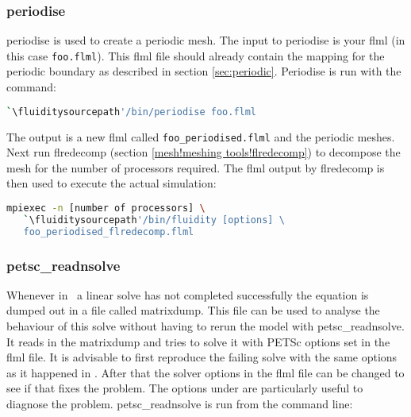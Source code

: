 
\subsubsection{periodise}
\label{sec:periodise}
periodise is used to create a periodic mesh. The input to periodise is your flml (in this case
\lstinline{foo.flml}). This flml file should already contain the mapping for
the periodic boundary as described in section
\ref{sec:periodic}. Periodise is run with the command:

\begin{lstlisting}[language=bash]
`\fluiditysourcepath'/bin/periodise foo.flml
\end{lstlisting}

The output is a new flml called \lstinline+foo_periodised.flml+ and the
periodic meshes. Next run flredecomp (section \ref{mesh!meshing
  tools!flredecomp}) to decompose the mesh for the number of processors
required. The flml output by flredecomp is then used to execute the actual simulation:

\begin{lstlisting}[language=bash]
mpiexec -n [number of processors] \
   `\fluiditysourcepath'/bin/fluidity [options] \
   foo_periodised_flredecomp.flml
\end{lstlisting}



\subsubsection{petsc\_readnsolve}
\label{sec:petsc_readnsolve} 
Whenever in \fluidity\ a linear solve has not completed successfully the equation is dumped out in a file called matrixdump. This file can be used to analyse the behaviour of this solve without having to rerun the model with petsc\_readnsolve. It reads in the matrixdump and tries to solve it with PETSc options set in the flml file. It is advisable to first reproduce the failing solve with the same options as it happened in \fluidity. After that the solver options in the flml file can be changed to see if that fixes the problem. The options under  are particularly useful to diagnose the problem.  petsc\_readnsolve is run from the command line:


